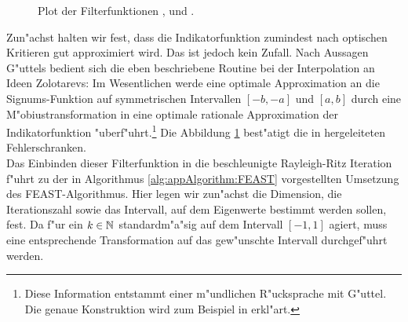 \begin{figure}[h!]
\centering


\caption{Plot der Filterfunktionen ,  und .}\label{fig:chap5:ratFun}
\end{figure}

Zun"achst halten wir fest, dass die Indikatorfunktion zumindest nach optischen Kritieren gut approximiert wird. Das ist jedoch kein Zufall.
Nach Aussagen G"uttels bedient sich die eben beschriebene Routine bei der Interpolation an Ideen Zolotarevs: Im Wesentlichen werde eine optimale Approximation an die Signums-Funktion auf symmetrischen Intervallen $[-b,-a]$ und $[a,b]$ durch eine M"obiustransformation in eine optimale rationale Approximation der Indikatorfunktion "uberf"uhrt.\footnote{Diese Information entstammt einer m"undlichen R"ucksprache mit G"uttel. Die genaue Konstruktion wird zum Beispiel in \cite[Abschnitt 4]{zol} erkl"art.} Die Abbildung \ref{fig:chap5:ratFun} best"atigt die in \cite[Abschnitt 4]{zol} hergeleiteten Fehlerschranken.\\

Das Einbinden dieser Filterfunktion in die beschleunigte Rayleigh-Ritz Iteration f"uhrt zu der in Algorithmus \ref{alg:appAlgorithm:FEAST} vorgestellten Umsetzung des FEAST-Algorithmus. Hier legen wir zun"achst die Dimension, die Iterationszahl sowie das Intervall, auf dem Eigenwerte bestimmt werden sollen, fest. Da  f"ur ein $k\in\mathbb{N}$ standardm"a"sig auf dem Intervall $[-1,1]$ agiert, muss eine entsprechende Transformation auf das gew"unschte Intervall durchgef"uhrt werden.

